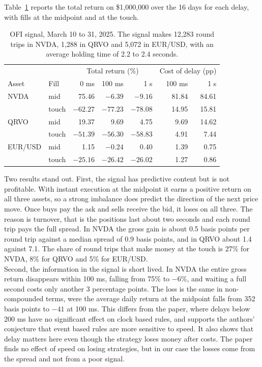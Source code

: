 \documentclass{article}
\begin{document}
\noindent Table~\ref{tab:ofi_results} reports the total return on \$1,000,000 over the 16 days for each delay, with fills at the midpoint and at the touch.

\begin{table}[H]
\centering
\begin{tabular}{llrrrrr}
\hline
 & & \multicolumn{3}{c}{Total return (\%)} & \multicolumn{2}{c}{Cost of delay (pp)} \\
Asset & Fill & 0 ms & 100 ms & 1 s & 100 ms & 1 s \\
\hline
NVDA & mid & 75.46 & $-6.39$ & $-9.16$ & 81.84 & 84.61 \\
 & touch & $-62.27$ & $-77.23$ & $-78.08$ & 14.95 & 15.81 \\
QRVO & mid & 19.37 & 9.69 & 4.75 & 9.69 & 14.62 \\
 & touch & $-51.39$ & $-56.30$ & $-58.83$ & 4.91 & 7.44 \\
EUR/USD & mid & 1.15 & $-0.24$ & 0.40 & 1.39 & 0.75 \\
 & touch & $-25.16$ & $-26.42$ & $-26.02$ & 1.27 & 0.86 \\
\hline
\end{tabular}
\caption{OFI signal, March 10 to 31, 2025. The signal makes 12,283 round trips in NVDA, 1,288 in QRVO and 5,072 in EUR/USD, with an average holding time of 2.2 to 2.4 seconds.}
\label{tab:ofi_results}
\end{table}

\noindent Two results stand out. First, the signal has predictive content but is not profitable. With instant execution at the midpoint it earns a positive return on all three assets, so a strong imbalance does predict the direction of the next price move. Once buys pay the ask and sells receive the bid, it loses on all three. The reason is turnover, that is the positions last about two seconds and each round trip pays the full spread. In NVDA the gross gain is about 0.5 basis points per round trip against a median spread of 0.9 basis points, and in QRVO about 1.4 against 7.1. The share of round trips that make money at the touch is 27\% for NVDA, 8\% for QRVO and 5\% for EUR/USD.\\

\noindent Second, the information in the signal is short lived. In NVDA the entire gross return disappears within 100 ms, falling from 75\% to $-6\%$, and waiting a full second costs only another 3 percentage points. The loss is the same in non-compounded terms, were the average daily return at the midpoint falls from 352 basis points to $-41$ at 100 ms. This differs from the paper, where delays below 200 ms have no significant effect on clock based rules, and supports the authors' conjecture that event based rules are more sensitive to speed. It also shows that delay matters here even though the strategy loses money after costs. The paper finds no effect of speed on losing strategies, but in our case the losses come from the spread and not from a poor signal.\\
\end{document}
